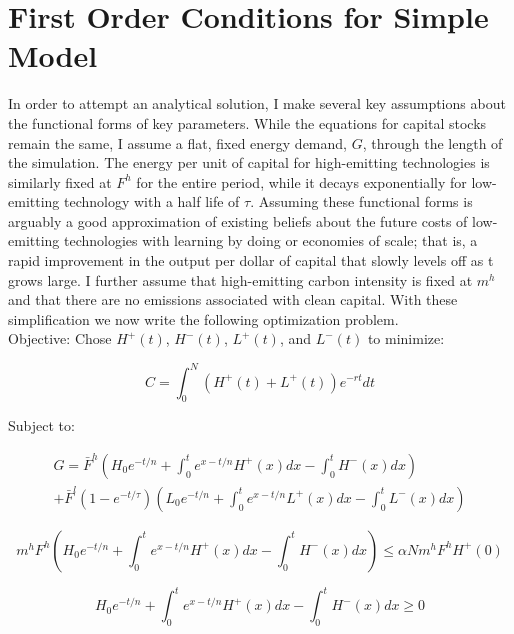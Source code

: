 \documentclass{article}
\begin{document}
\pagebreak
\appendix
\section{First Order Conditions for Simple Model}

In order to attempt an analytical solution, I make several key assumptions about the functional forms of key parameters. While the equations for capital stocks remain the same, I assume a flat, fixed energy demand, $G$, through the length of the simulation. The energy per unit of capital for high-emitting technologies is similarly fixed at $F^h$ for the entire period, while it decays exponentially for low-emitting technology with a half life of $\tau$. Assuming these functional forms is arguably a good approximation of existing beliefs about the future costs of low-emitting technologies with learning by doing or economies of scale; that is, a rapid improvement in the output per dollar of capital that slowly levels off as t grows large. I further assume that high-emitting carbon intensity is fixed at $m^h$ and that there are no emissions associated with clean capital. With these simplification we now write the following optimization problem. \\

Objective: Chose $H^+(t)$, $H^-(t)$, $L^+(t)$, and $L^-(t)$ to minimize:

\begin{equation}\label{eq:analyticalObj}
C = \int_0^N (H^+(t) + L^+(t))e^{-rt} dt
\end{equation}

Subject to: 

\begin{multline}\label{eq:analyticalGen}
G = \bar{F}^h\left (H_0 e^{-t/n} + \int_0^t e^{x-t/n} H^+(x) dx - \int_0^t H^-(x)dx \right) \\ + \bar{F}^l(1-e^{-t/\tau}) \left ( L_0 e^{-t/n} + \int_0^t e^{x-t/n} L^+(x) dx - \int_0^t L^-(x)dx\right )
\end{multline}

\begin{equation}\label{eq:analyticalEmit}
m^hF^h\left (H_0 e^{-t/n} + \int_0^t e^{x-t/n} H^+(x) dx - \int_0^t H^-(x)dx \right) \leq \alpha N m^h F^h H^+(0)
\end{equation}

\begin{equation}\label{eq:analyticalHCapConstraint}
H_0 e^{-t/n} + \int_0^t e^{x-t/n} H^+(x) dx - \int_0^t H^-(x)dx \geq 0 
\end{equation}
\end{document}
